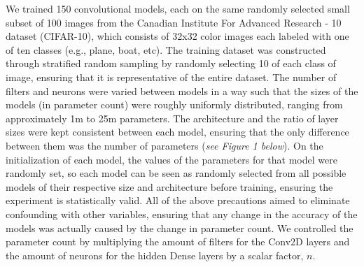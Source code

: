 \documentclass[12pt]{article}
\begin{document}
    We trained 150 convolutional models, each on the same randomly selected small subset of 100 images
    from the Canadian Institute For Advanced Research - 10 dataset (CIFAR-10), which consists of 32x32 color images each labeled with one of ten classes (e.g., plane, boat, etc).
    The training dataset was constructed through stratified random sampling by randomly selecting 10 of each class of image, ensuring that it is representative of the entire dataset.
    The number of filters and neurons were varied between models in a way such that the sizes of the models (in parameter count) were roughly uniformly distributed, ranging from approximately 1m to 25m parameters.
    The architecture and the ratio of layer sizes were kept consistent between each model, ensuring that the only difference between them was the number of parameters (\textit{see Figure 1 below}).
    On the initialization of each model, the values of the parameters for that model were randomly set, so each model can be seen as randomly
    selected from all possible models of their respective size and architecture before training, ensuring the experiment is statistically valid.
    All of the above precautions aimed to eliminate confounding with other variables, ensuring that any change in the accuracy of the models was actually caused by the change in parameter count.
    We controlled the parameter count by multiplying the amount of filters for the Conv2D layers and the amount of neurons
    for the hidden Dense layers by a scalar factor, $n$.
\end{document}
